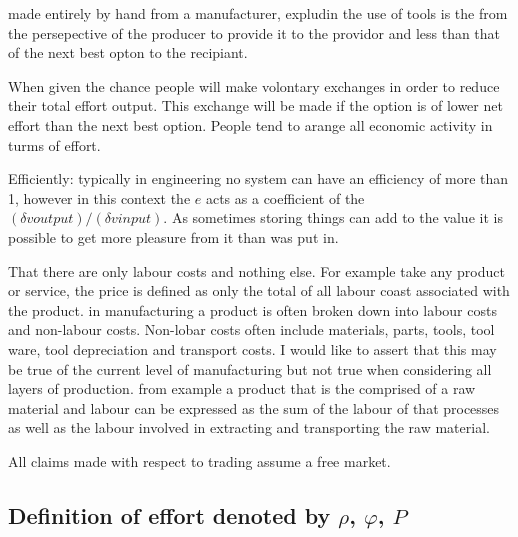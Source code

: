 \documentclass[]{article}
\begin{document}
made entirely by hand from a manufacturer, expludin the use of tools is the  from the persepective of the producer  to provide it to the providor and less 
than that of the next best opton to the recipiant.

When given the chance people will make volontary exchanges in order to reduce their total effort output. This 
exchange will be made if the option is of lower net effort than the next best option. 
People tend to arange all economic activity in turms of effort. 


Efficiently: typically in engineering no system can have an efficiency of more than 1, however in this context the $e$ acts as a coefficient of the $(\delta v output) / ( \delta v input)$. As sometimes storing things can add to the value it is possible to get more pleasure from it than was put in.

That there are only labour costs and nothing else. For example take any product or service, the price is defined as only the total of all labour coast associated with the product. in manufacturing a product is often broken down into labour costs and non-labour costs. Non-lobar costs often include materials, parts, tools, tool ware, tool depreciation and transport costs. I would like to assert that this may be true of the current level of manufacturing but not true when considering all layers of production. from example a product that is the comprised of a raw material and labour can be expressed as the sum of the labour of that processes as well as the labour involved in extracting and transporting the raw material. 

All claims made with respect to trading assume a free market.

\subsection{Definition of effort denoted by $\rho$, $\varphi$, $P$}
\end{document}
